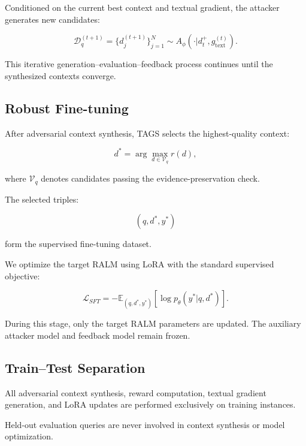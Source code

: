\documentclass[11pt]{article}
\begin{document}
Conditioned on the current best context and textual gradient, the attacker generates new candidates:

\begin{equation}
\mathcal{D}^{(t+1)}_q
=
\{d_j^{(t+1)}\}_{j=1}^{N}
\sim
A_{\phi}
(\cdot|d_t^+,g_{\mathrm{text}}^{(t)}).
\end{equation}

This iterative generation--evaluation--feedback process continues until the synthesized contexts converge.


\subsection{Robust Fine-tuning}

After adversarial context synthesis, TAGS selects the highest-quality context:

\begin{equation}
d^*
=
\arg\max_{d\in\mathcal{V}_q}r(d),
\end{equation}

where $\mathcal{V}_q$ denotes candidates passing the evidence-preservation check.

The selected triples:

\begin{equation}
(q,d^*,y^*)
\end{equation}

form the supervised fine-tuning dataset.

We optimize the target RALM using LoRA with the standard supervised objective:

\begin{equation}
\mathcal{L}_{SFT}
=
-
\mathbb{E}_{(q,d^*,y^*)}
[
\log p_{\theta}(y^*|q,d^*)
].
\end{equation}

During this stage, only the target RALM parameters are updated.
The auxiliary attacker model and feedback model remain frozen.


\subsection{Train--Test Separation}

All adversarial context synthesis, reward computation, textual gradient generation, and LoRA updates are performed exclusively on training instances.

Held-out evaluation queries are never involved in context synthesis or model optimization.
\end{document}
